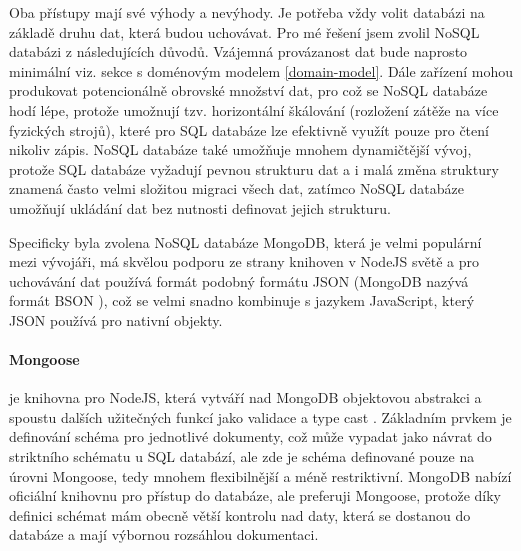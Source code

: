 Oba přístupy mají své výhody a nevýhody. Je potřeba vždy volit databázi na základě druhu dat, která budou uchovávat. Pro mé řešení jsem zvolil NoSQL databázi z následujících důvodů. Vzájemná provázanost dat bude naprosto minimální viz. sekce s doménovým modelem \ref{domain-model}. Dále zařízení mohou produkovat potencionálně obrovské množství dat, pro což se NoSQL databáze hodí lépe, protože umožnují tzv. horizontální škálování (rozložení zátěže na více fyzických strojů), které pro SQL databáze lze efektivně využít pouze pro čtení nikoliv zápis. NoSQL databáze také umožňuje mnohem dynamičtější vývoj, protože SQL databáze vyžadují pevnou strukturu dat a i malá změna struktury znamená často velmi složitou migraci všech dat, zatímco NoSQL databáze umožňují ukládání dat bez nutnosti definovat jejich strukturu.

Specificky byla zvolena NoSQL databáze MongoDB, která je velmi populární mezi vývojáři, má skvělou podporu ze strany knihoven v NodeJS světě a pro uchovávání dat používá formát podobný formátu JSON (MongoDB nazývá formát BSON \cite{bson-vs-json}), což se velmi snadno kombinuje s jazykem JavaScript, který JSON používá pro nativní objekty.

\paragraph{Mongoose} je knihovna pro NodeJS, která vytváří nad MongoDB objektovou abstrakci a spoustu dalších užitečných funkcí jako validace a type cast \cite{mongoose}. Základním prvkem je definování schéma pro jednotlivé dokumenty, což může vypadat jako návrat do striktního schématu u SQL databází, ale zde je schéma definované pouze na úrovni Mongoose, tedy mnohem flexibilnější a méně restriktivní. MongoDB nabízí oficiální knihovnu pro přístup do databáze, ale preferuji Mongoose, protože díky definici schémat mám obecně větší kontrolu nad daty, která se dostanou do databáze a mají výbornou rozsáhlou dokumentaci.

